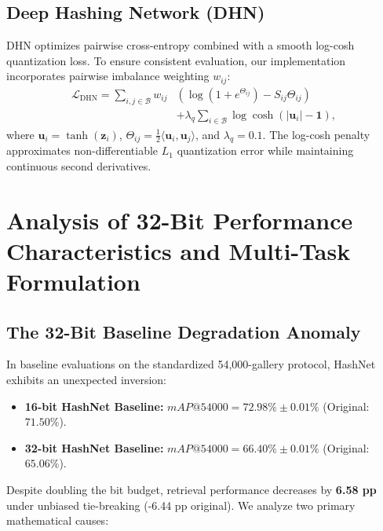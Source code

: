 \documentclass[10pt,conference]{IEEEtran}
\begin{document}
\subsection{Deep Hashing Network (DHN)}
DHN \cite{zhu2016deep} optimizes pairwise cross-entropy combined with a smooth log-cosh quantization loss. To ensure consistent evaluation, our implementation incorporates pairwise imbalance weighting $w_{ij}$:
\begin{align}
    \mathcal{L}_{\text{DHN}} = \sum_{i,j \in \mathcal{B}} w_{ij} & \left( \log(1 + e^{\Theta_{ij}}) - S_{ij} \Theta_{ij} \right) \nonumber \\
    & + \lambda_q \sum_{i \in \mathcal{B}} \log \cosh(|\mathbf{u}_i| - \mathbf{1}),
\end{align}
where $\mathbf{u}_i = \tanh(\mathbf{z}_i)$, $\Theta_{ij} = \frac{1}{2} \langle \mathbf{u}_i, \mathbf{u}_j \rangle$, and $\lambda_q = 0.1$. The log-cosh penalty approximates non-differentiable $L_1$ quantization error while maintaining continuous second derivatives.

\section{Analysis of 32-Bit Performance Characteristics and Multi-Task Formulation}

\subsection{The 32-Bit Baseline Degradation Anomaly}
In baseline evaluations on the standardized 54,000-gallery protocol, HashNet exhibits an unexpected inversion:
\begin{itemize}
    \item \textbf{16-bit HashNet Baseline:} $mAP@54000 = \mathbf{72.98\%} \pm 0.01\%$ (Original: $71.50\%$).
    \item \textbf{32-bit HashNet Baseline:} $mAP@54000 = \mathbf{66.40\%} \pm 0.01\%$ (Original: $65.06\%$).
\end{itemize}
Despite doubling the bit budget, retrieval performance decreases by \textbf{6.58 pp} under unbiased tie-breaking (-6.44 pp original). We analyze two primary mathematical causes:
\end{document}
